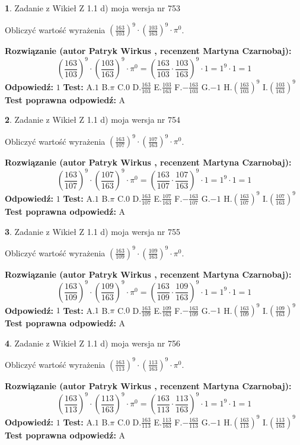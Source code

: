 \documentclass[12pt, a4paper]{article}
\theoremstyle{definition} %
\newtheorem{zad}{}
\newcommand{\zadStart}[1]{\begin{zad}#1\newline}
\newcommand{\zadStop}{\end{zad}}
\newcommand{\rozwStart}[2]{\noindent \textbf{Rozwiązanie (autor #1 , recenzent #2): }\newline}
\newcommand{\rozwStop}{\newline}
\newcommand{\odpStart}{\noindent \textbf{Odpowiedź:}\newline}
\newcommand{\odpStop}{\newline}
\newcommand{\testStart}{\noindent \textbf{Test:}\newline}
\newcommand{\testStop}{\newline}
\newcommand{\kluczStart}{\noindent \textbf{Test poprawna odpowiedź:}\newline}
\newcommand{\kluczStop}{\newline}
\begin{document}
\zadStart{Zadanie z Wikieł Z 1.1 d) moja wersja nr 753}

Obliczyć wartość wyrażenia $(\frac{163}{103})^{9} \cdot (\frac{103}{163})^{9} \cdot \pi^{0}$.
\zadStop
\rozwStart{Patryk Wirkus}{Martyna Czarnobaj}
$$(\frac{163}{103})^{9} \cdot (\frac{103}{163})^{9} \cdot \pi^{0} = (\frac{163}{103} \cdot \frac{103}{163})^{9} \cdot 1 = 1^{9} \cdot 1 = 1$$
\rozwStop
\odpStart
$1$
\odpStop
\testStart
A.$1$ B.$\pi$ C.$0$ D.$\frac{163}{103}$ E.$\frac{103}{163}$
F.$-\frac{163}{103}$ G.$-1$
H.$(\frac{163}{103})^{9}$
I.$(\frac{103}{163})^{9}$
\testStop
\kluczStart
A
\kluczStop



\zadStart{Zadanie z Wikieł Z 1.1 d) moja wersja nr 754}

Obliczyć wartość wyrażenia $(\frac{163}{107})^{9} \cdot (\frac{107}{163})^{9} \cdot \pi^{0}$.
\zadStop
\rozwStart{Patryk Wirkus}{Martyna Czarnobaj}
$$(\frac{163}{107})^{9} \cdot (\frac{107}{163})^{9} \cdot \pi^{0} = (\frac{163}{107} \cdot \frac{107}{163})^{9} \cdot 1 = 1^{9} \cdot 1 = 1$$
\rozwStop
\odpStart
$1$
\odpStop
\testStart
A.$1$ B.$\pi$ C.$0$ D.$\frac{163}{107}$ E.$\frac{107}{163}$
F.$-\frac{163}{107}$ G.$-1$
H.$(\frac{163}{107})^{9}$
I.$(\frac{107}{163})^{9}$
\testStop
\kluczStart
A
\kluczStop



\zadStart{Zadanie z Wikieł Z 1.1 d) moja wersja nr 755}

Obliczyć wartość wyrażenia $(\frac{163}{109})^{9} \cdot (\frac{109}{163})^{9} \cdot \pi^{0}$.
\zadStop
\rozwStart{Patryk Wirkus}{Martyna Czarnobaj}
$$(\frac{163}{109})^{9} \cdot (\frac{109}{163})^{9} \cdot \pi^{0} = (\frac{163}{109} \cdot \frac{109}{163})^{9} \cdot 1 = 1^{9} \cdot 1 = 1$$
\rozwStop
\odpStart
$1$
\odpStop
\testStart
A.$1$ B.$\pi$ C.$0$ D.$\frac{163}{109}$ E.$\frac{109}{163}$
F.$-\frac{163}{109}$ G.$-1$
H.$(\frac{163}{109})^{9}$
I.$(\frac{109}{163})^{9}$
\testStop
\kluczStart
A
\kluczStop



\zadStart{Zadanie z Wikieł Z 1.1 d) moja wersja nr 756}

Obliczyć wartość wyrażenia $(\frac{163}{113})^{9} \cdot (\frac{113}{163})^{9} \cdot \pi^{0}$.
\zadStop
\rozwStart{Patryk Wirkus}{Martyna Czarnobaj}
$$(\frac{163}{113})^{9} \cdot (\frac{113}{163})^{9} \cdot \pi^{0} = (\frac{163}{113} \cdot \frac{113}{163})^{9} \cdot 1 = 1^{9} \cdot 1 = 1$$
\rozwStop
\odpStart
$1$
\odpStop
\testStart
A.$1$ B.$\pi$ C.$0$ D.$\frac{163}{113}$ E.$\frac{113}{163}$
F.$-\frac{163}{113}$ G.$-1$
H.$(\frac{163}{113})^{9}$
I.$(\frac{113}{163})^{9}$
\testStop
\kluczStart
A
\kluczStop
\end{document}

